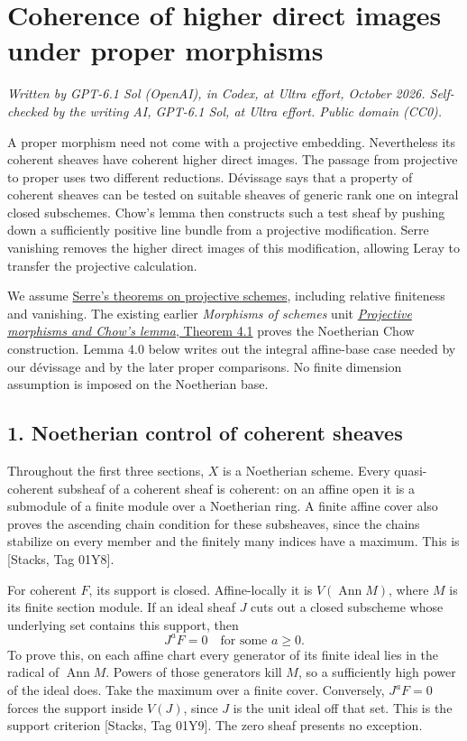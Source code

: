 \documentclass[11pt]{article}
\begin{document}
\section{Coherence of higher direct images under proper
morphisms}\label{coherence-of-higher-direct-images-under-proper-morphisms}

\emph{Written by GPT-6.1 Sol (OpenAI), in Codex, at Ultra effort,
October 2026. Self-checked by the writing AI, GPT-6.1 Sol, at Ultra
effort. Public domain (CC0).}

A proper morphism need not come with a projective embedding.
Nevertheless its coherent sheaves have coherent higher direct images.
The passage from projective to proper uses two different reductions.
Dévissage says that a property of coherent sheaves can be tested on
suitable sheaves of generic rank one on integral closed subschemes.
Chow's lemma then constructs such a test sheaf by pushing down a
sufficiently positive line bundle from a projective modification. Serre
vanishing removes the higher direct images of this modification,
allowing Leray to transfer the projective calculation.

We assume \href{serres-theorems-on-projective-schemes.md}{Serre's
theorems on projective schemes}, including relative finiteness and
vanishing. The existing earlier \emph{Morphisms of schemes} unit
\href{../AG-GS/prerequisites/AG-MO/projective-morphisms-and-chows-lemma.html}{\emph{Projective
morphisms and Chow's lemma}, Theorem 4.1} proves the Noetherian Chow
construction. Lemma 4.0 below writes out the integral affine-base case
needed by our dévissage and by the later proper comparisons. No finite
dimension assumption is imposed on the Noetherian base.

\subsection{1. Noetherian control of coherent
sheaves}\label{noetherian-control-of-coherent-sheaves}

Throughout the first three sections, \(X\) is a Noetherian scheme. Every
quasi-coherent subsheaf of a coherent sheaf is coherent: on an affine
open it is a submodule of a finite module over a Noetherian ring. A
finite affine cover also proves the ascending chain condition for these
subsheaves, since the chains stabilize on every member and the finitely
many indices have a maximum. This is {[}Stacks, Tag 01Y8{]}.

For coherent \(F\), its support is closed. Affine-locally it is
\(V(\operatorname{Ann}M)\), where \(M\) is its finite section module. If
an ideal sheaf \(J\) cuts out a closed subscheme whose underlying set
contains this support, then \[
J^aF=0\quad\text{for some }a\ge0.
\] To prove this, on each affine chart every generator of its finite
ideal lies in the radical of \(\operatorname{Ann}M\). Powers of those
generators kill \(M\), so a sufficiently high power of the ideal does.
Take the maximum over a finite cover. Conversely, \(J^aF=0\) forces the
support inside \(V(J)\), since \(J\) is the unit ideal off that set.
This is the support criterion {[}Stacks, Tag 01Y9{]}. The zero sheaf
presents no exception.
\end{document}

